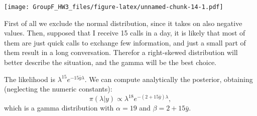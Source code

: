 \documentclass[
]{article}
\begin{document}
\texttt{[image: GroupF\_HW3\_files/figure-latex/unnamed-chunk-14-1.pdf]}

First of all we exclude the normal distribution, since it takes on also
negative values. Then, supposed that I receive 15 calls in a day, it is
likely that most of them are just quick calls to exchange few
information, and just a small part of them result in a long
conversation. Therefor a right-skewed distribution will better describe
the situation, and the gamma will be the best choice.

The likelihood is \(\lambda^{15}e^{-15\bar{y}\lambda}\). We can compute
analytically the posterior, obtaining (neglecting the numeric
constants): \[
\pi\left(\lambda|y\right) \propto \lambda^{18}e^{-\left(2+15\bar{y}\right)\lambda},
\] which is a gamma distribution with \(\alpha=19\) and
\(\beta=2+15\bar{y}\).
\end{document}
